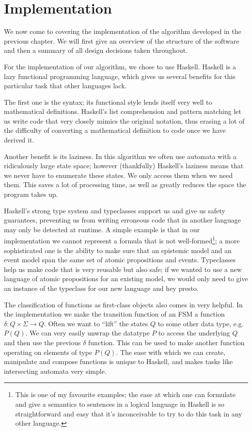 \documentclass[10pt, a4paper]{report}
\begin{document}
\newpage 

\chapter{Implementation}

We now come to covering the implementation of the algorithm developed in the
previous chapter. We will first give an overview of the structure of the
software and then a summary of all design decisions taken throughout. 

For the implementation of our algorithm, we chose to use Haskell. Haskell is a
lazy functional programming language, which gives us several benefits for this
particular task that other languages lack. 

The first one is the syntax; its functional style lends itself very well to
mathematical definitions. Haskell's list comprehension and pattern matching let us
write code that very closely mimics the original notation, thus erasing a lot of
the difficulty of converting a mathematical definition to code once we have
derived it. 

Another benefit is its laziness. In this algorithm we often use automata
with a ridiculously large state space; however (thankfully) Haskell's laziness
means that we never have to enumerate these states. We only access them when we
need them. This saves a lot of processing time, as well as greatly reduces the
space the program takes up.

Haskell's strong type system and typeclasses support us and give us safety
guarantees, preventing us from writing erroneous code that in another language
may only be detected at runtime. A simple example is that in our implementation
we cannot represent a formula that is not well-formed\footnote{This is one of my
  favourite examples; the ease at which one can formulate and give a semantics
  to sentences in a logical language in Haskell is so straightforward and easy
  that it's inconceivable to try to do this task in any other language.}; a more
sophisticated one is the ability to make sure that an epistemic model and an
event model span the same set of atomic propositions and events. Typeclasses
help us make code that is very reusable but also safe; if we wanted to use a new
language of atomic propositions for an existing model, we would only need to
give an instance of the  typeclass for our new language and hey
presto.

The classification of functions as first-class objects also comes in very
helpful. In the implementation we make the transition function of an FSM a
function $\delta : Q \times \Sigma \rightarrow Q$. Often we want to ``lift'' the
states $Q$ to some other data type, e.g. $P (Q)$. We can very easily unwrap the
datatype $P$ to access the underlying $Q$ and then use the previous $\delta$
function. This can be used to make another function operating on elements of
type $P (Q)$. The ease with which we can create, manipulate and compose
functions is unique to Haskell, and makes tasks like intersecting automata very
simple. 
\end{document}
